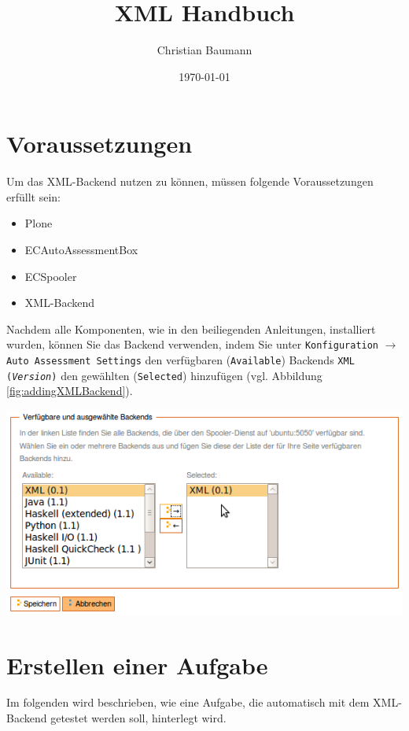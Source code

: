\documentclass[a4paper]{scrartcl}
\title{XML Handbuch}
\author{Christian Baumann}
\date{\today}
\newcommand{\anf}[1]{\glqq{}#1\grqq{}}
\begin{document}
  \maketitle
  
  \newpage
  
  \tableofcontents
  
  \newpage
  
	\section{Voraussetzungen}
	Um das XML-Backend nutzen zu können, müssen folgende Voraussetzungen erfüllt sein:
	\begin{itemize}
	  \item Plone
	  \item ECAutoAssessmentBox
	  \item ECSpooler
	  \item XML-Backend
	\end{itemize}
	Nachdem alle Komponenten, wie in den beiliegenden Anleitungen, installiert wurden, können Sie das Backend verwenden, indem Sie unter \texttt{Konfiguration} $\rightarrow$ \texttt{Auto Assessment Settings} den verfügbaren (\texttt{Available}) Backends \anf{\texttt{XML (\textit{Version})}} den gewählten (\texttt{Selected}) hinzufügen (vgl. Abbildung \ref{fig:addingXMLBackend}).
	
  \begin{center}
    \captionsetup{type=figure}
	  \includegraphics[width=1\textwidth]{images/AddingXMLBackend.png}
	  \label{fig:addingXMLBackend}
  \end{center}
	
	\section{Erstellen einer Aufgabe}
	  Im folgenden wird beschrieben, wie eine Aufgabe, die automatisch mit dem XML-Backend getestet werden soll, hinterlegt wird.
	  
\end{document}
